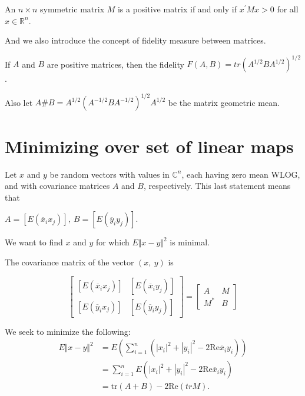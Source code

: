 \begin{definition}
	An $n\times n$ symmetric matrix $M$ is a positive matrix if and only if $x^{'} M x>0$ for all $x\in \mathbb{R}^n$.
\end{definition}

And we also introduce the concept of fidelity measure between matrices. 

\begin{definition}[Fidelity]
	If $A$ and $B$ are positive matrices, then the fidelity $F(A,B) = tr(A^{1/2}BA^{1/2})^{1/2}$.
\end{definition}

Also let $A\#B=A^{1/2}(A^{-1/2}BA^{-1/2})^{1/2}A^{1/2}$ be the matrix geometric mean.

\section*{Minimizing over set of linear maps \cite{Bhatia2019}}
Let $x$ and $y$ be random vectors with values in $\mathbb{C}^{n}$, each having zero mean WLOG, and with covariance matrices $A$ and $B$, respectively. This last statement means that
\begin{center}
	$A=[E(\overline{x}_{i}x_{j})],\ B=[E(\overline{y}_{i}y_{j})]$.
\end{center}

We want to find $x$ and $y$ for which $E\Vert x-y\Vert^{2}$ is minimal.

The covariance matrix of the vector $(x,\ y)$ is

$$
\left[ \begin{matrix}
	[E(\overline{x}_{i}x_{j})] & [E(\overline{x}_{i}y_{j})] \\
	[E(\overline{y}_{i}x_{j})] & [E(\overline{y}_{i}y_{j})]
\end{matrix}\right]
=
\left[ \begin{matrix}
	A & M \\
	M^{*} & B
\end{matrix}\right]
$$

We seek to minimize the following:
\begin{align*}
E\Vert x-y\Vert^{2} &= E(\displaystyle \sum_{i=1}^{n}(|x_{i}|^{2}+|y_{i}|^{2}-2\mathrm{Re}\overline{x}_{i}y_{i})) \\
&= \sum_{i=1}^{n}E(|x_{i}|^{2}+|y_{i}|^{2}-2\mathrm{Re}\overline{x}_{i}y_{i}) \\
&= \mathrm{tr}(A+B)-2\mathrm{Re} (tr M).
\end{align*}

